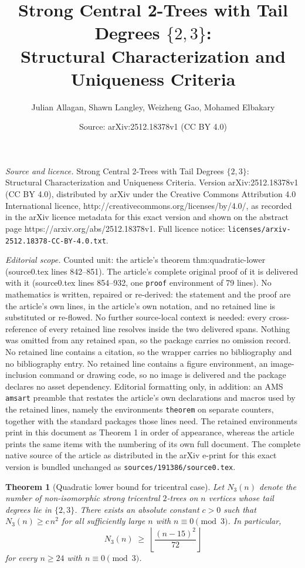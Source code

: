 \documentclass[10pt,a4paper]{amsart}
\title{Strong Central 2-Trees with Tail Degrees \texorpdfstring{$\{2,3\}$}{\{2,3\}}:\\Structural Characterization and Uniqueness Criteria}
\author{Julian Allagan, Shawn Langley, Weizheng Gao, Mohamed Elbakary}
\date{Source: arXiv:2512.18378v1 (CC BY 4.0)}
\newtheorem{theorem}{Theorem}
\begin{document}
\maketitle

\noindent\emph{Source and licence.} Strong Central 2-Trees with Tail Degrees \texorpdfstring{$\{2,3\}$}{\{2,3\}}:\\Structural Characterization and Uniqueness Criteria. Version arXiv:2512.18378v1 (CC BY 4.0), distributed by arXiv under the Creative Commons Attribution 4.0 International licence, http://creativecommons.org/licenses/by/4.0/, as recorded in the arXiv licence metadata for this exact version and shown on the abstract page https://arxiv.org/abs/2512.18378v1. Full licence notice: \texttt{licenses/arxiv-2512.18378-CC-BY-4.0.txt}.\par\smallskip

\noindent\textit{Editorial scope.} Counted unit: the article's theorem thm:quadratic-lower (source0.tex lines 842--851). The article's complete original proof of it is delivered with it (source0.tex lines 854--932, one \texttt{proof} environment of 79 lines). No mathematics is written, repaired or re-derived: the statement and the proof are the article's own lines, in the article's own notation, and no retained line is substituted or re-flowed.  No further source-local context is needed: every cross-reference of every retained line resolves inside the two delivered spans.  Nothing was omitted from any retained span, so the package carries no omission record.  No retained line contains a citation, so the wrapper carries no bibliography and no bibliography entry.  No retained line contains a figure environment, an image-inclusion command or drawing code, so no image is delivered and the package declares no asset dependency.  Editorial formatting only, in addition: an AMS \texttt{amsart} preamble that restates the article's own declarations and macros used by the retained lines, namely the environments \texttt{theorem} on separate counters, together with the standard packages those lines need.  The retained environments print in this document as Theorem 1 in order of appearance, whereas the article prints the same items with the numbering of its own full document.  The complete native source of the article as distributed in the arXiv e-print for this exact version is bundled unchanged as \texttt{sources/191386/source0.tex}.
\begin{theorem}[Quadratic lower bound for tricentral case]
\label{thm:quadratic-lower}
Let $N_3(n)$ denote the number of non-isomorphic strong tricentral $2$-trees on $n$ vertices whose tail degrees lie in $\{2,3\}$.
There exists an absolute constant $c>0$ such that $N_3(n)\ge c\,n^2$ for all sufficiently large $n$ with $n\equiv 0\pmod 3$.
In particular,
\[
N_3(n)\;\ge\;\left\lfloor \frac{(n-15)^2}{72}\right\rfloor
\]
for every $n\ge 24$ with $n\equiv 0\pmod 3$.
\end{theorem}
\end{document}
